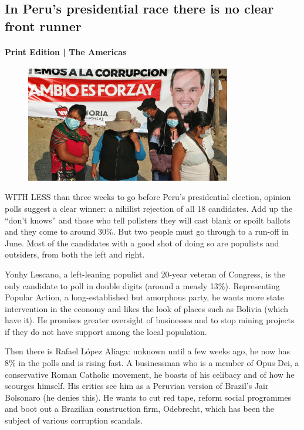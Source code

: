 \documentclass{article}
\begin{document}
\subsection{In Peru's presidential race there is no clear front runner }
\paragraph{Print Edition | The Americas  \quad \color{gray}{Mar 27th 2021 }}
\begin{figure}[h]
\centering
\includegraphics[width=0.8\textwidth]{images/20210327_amp501.jpg}
\end{figure}
\lettrine{W}ITH LESS than three weeks to go before Peru's presidential election, opinion polls suggest a clear winner: a nihilist rejection of all 18 candidates. Add up the ``don't knows'' and those who tell pollsters they will cast blank or spoilt ballots and they come to around 30\%. But two people must go through to a run-off in June. Most of the candidates with a good shot of doing so are populists and outsiders, from both the left and right. 

Yonhy Lescano, a left-leaning populist and 20-year veteran of Congress, is the only candidate to poll in double digits (around a measly 13\%). Representing Popular Action, a long-established but amorphous party, he wants more state intervention in the economy and likes the look of places such as Bolivia (which have it). He promises greater oversight of businesses and to stop mining projects if they do not have support among the local population. 

Then there is Rafael López Aliaga: unknown until a few weeks ago, he now has 8\% in the polls and is rising fast. A businessman who is a member of Opus Dei, a conservative Roman Catholic movement, he boasts of his celibacy and of how he scourges himself. His critics see him as a Peruvian version of Brazil's Jair Bolsonaro (he denies this). He wants to cut red tape, reform social programmes and boot out a Brazilian construction firm, Odebrecht, which has been the subject of various corruption scandals. 
\end{document}
